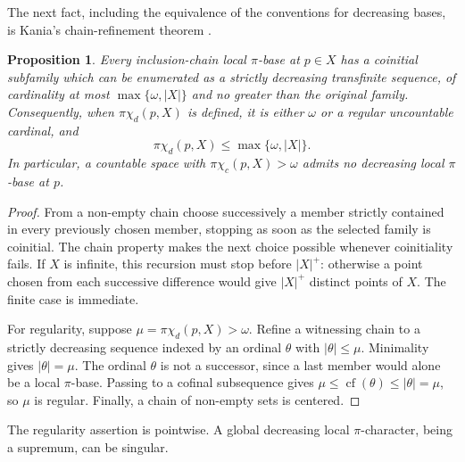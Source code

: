 \documentclass[10pt,a4paper]{amsart}
\newtheorem{proposition}[theorem]{Proposition}
\theoremstyle{definition}
\theoremstyle{remark}
\newcommand{\pcc}{\pi\chi_c}
\newcommand{\pcd}{\pi\chi_d}
\DeclareMathOperator{\cf}{cf}
\begin{document}
The next fact, including the equivalence of the conventions for decreasing bases, is Kania's chain-refinement theorem \cite[Theorem B and Corollary 2.2]{Kania}.

\begin{proposition}\label{prop:chains}
Every inclusion-chain local $\pi$-base at $p\in X$ has a coinitial subfamily which can be enumerated as a strictly decreasing transfinite sequence, of cardinality at most $\max\{\omega,|X|\}$ and no greater than the original family. Consequently, when $\pcd(p,X)$ is defined, it is either $\omega$ or a regular uncountable cardinal, and
\[
\pcd(p,X)\leqslant\max\{\omega,|X|\}.
\]
In particular, a countable space with $\pcc(p,X)>\omega$ admits no decreasing local $\pi$-base at $p$.
\end{proposition}
\begin{proof}
From a non-empty chain choose successively a member strictly contained in every previously chosen member, stopping as soon as the selected family is coinitial. The chain property makes the next choice possible whenever coinitiality fails. If $X$ is infinite, this recursion must stop before $|X|^+$: otherwise a point chosen from each successive difference would give $|X|^+$ distinct points of $X$. The finite case is immediate.

For regularity, suppose $\mu=\pcd(p,X)>\omega$. Refine a witnessing chain to a strictly decreasing sequence indexed by an ordinal $\theta$ with $|\theta|\leqslant\mu$. Minimality gives $|\theta|=\mu$. The ordinal $\theta$ is not a successor, since a last member would alone be a local $\pi$-base. Passing to a cofinal subsequence gives $\mu\leqslant\cf(\theta)\leqslant|\theta|=\mu$, so $\mu$ is regular. Finally, a chain of non-empty sets is centered.
\end{proof}

The regularity assertion is pointwise. A global decreasing local $\pi$-character, being a supremum, can be singular.
\end{document}
